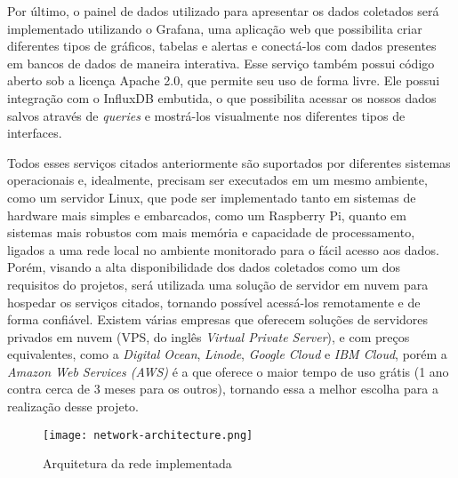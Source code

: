 \documentclass[../monografia.tex]{subfiles}
\begin{document}
Por último, o painel de dados utilizado para apresentar os dados coletados será implementado utilizando o Grafana, uma aplicação web que possibilita criar diferentes tipos de gráficos, tabelas e alertas e conectá-los com dados presentes em bancos de dados de maneira interativa. Esse serviço também possui código aberto sob a licença Apache 2.0, que permite seu uso de forma livre. Ele possui integração com o InfluxDB embutida, o que possibilita acessar os nossos dados salvos através de \textit{queries} e mostrá-los visualmente nos diferentes tipos de interfaces.



Todos esses serviços citados anteriormente são suportados por diferentes sistemas operacionais e, idealmente, precisam ser executados em um mesmo ambiente, como um servidor Linux, que pode ser implementado tanto em sistemas de hardware mais simples e embarcados, como um Raspberry Pi, quanto em sistemas mais robustos com mais memória e capacidade de processamento, ligados a uma rede local no ambiente monitorado para o fácil acesso aos dados. Porém, visando a alta disponibilidade dos dados coletados como um dos requisitos do projetos, será utilizada uma solução de servidor em nuvem para hospedar os serviços citados, tornando possível acessá-los remotamente e de forma confiável. Existem várias empresas que oferecem soluções de servidores privados em nuvem (VPS, do inglês \textit{Virtual Private Server}), e com preços equivalentes, como a \textit{Digital Ocean}, \textit{Linode}, \textit{Google Cloud} e \textit{IBM Cloud}, porém a \textit{Amazon Web Services (AWS)} é a que oferece o maior tempo de uso grátis (1 ano contra cerca de 3 meses para os outros), tornando essa a melhor escolha para a realização desse projeto. 


\begin{figure}[h!]
	\centering
	\texttt{[image: network-architecture.png]}
	\caption{Arquitetura da rede implementada}
	\label{fig:network-architecture}
\end{figure}
\end{document}
